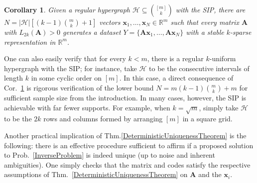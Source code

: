 \documentclass[9pt,twocolumn]{pnas-new}
\newtheorem{corollary}{Corollary}
\begin{document}
\begin{corollary}\label{DeterministicUniquenessCorollary}
Given a regular hypergraph $\mathcal{H} \subseteq {[m] \choose k}$ with the SIP, there are $N =  |\mathcal{H}| \left[ (k-1){m \choose k} + 1  \right]$ vectors \mbox{$\mathbf{x}_1, \ldots, \mathbf{x}_N \in \mathbb{R}^m$} such that every matrix $\mathbf{A}$ with $L_{2k}(\mathbf{A}) > 0$ generates a dataset $Y = \{\mathbf{A}\mathbf{x}_1, \ldots, \mathbf{A}\mathbf{x}_N\}$ with a stable $k$-sparse representation in $\mathbb{R}^m$.
\end{corollary}

One can also easily verify that for every $k < m$, there is a regular $k$-uniform hypergraph with the SIP; for instance, take $\mathcal{H}$ to be the consecutive intervals of length $k$ in some cyclic order on $[m]$.  In this case, a direct consequence of Cor.~\ref{DeterministicUniquenessCorollary} is rigorous verification of the lower bound \mbox{$N = m(k-1){m \choose k} + m$} for sufficient sample size from the introduction. In many cases, however, the SIP is achievable with far fewer supports.  For example, when $k = \sqrt{m}$, simply take $\mathcal{H}$ to be the $2k$ rows and columns formed by arranging $[m]$ in a square grid.

Another practical implication of Thm.\ref{DeterministicUniquenessTheorem} is the following: there is an effective procedure sufficient to affirm if a proposed solution to Prob.~\ref{InverseProblem} is indeed unique (up to noise and inherent ambiguities). One simply checks that the matrix and codes satisfy the respective assumptions of Thm.~\ref{DeterministicUniquenessTheorem} on $\mathbf{A}$ and the $\mathbf{x}_i$.  
\end{document}
